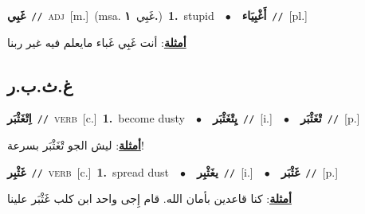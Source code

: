 \documentclass[10pt,a4paper,twoside]{article} %
\begin{document}
\begin{multicols}{2}
{{{{\setlength\topsep{0pt}\textbf{\foreignlanguage{arabic}{غَبِي}}\ {\color{gray}\texttt{//}\color{black}}\ \textsc{adj}\ [m.]\ \color{gray}(msa. \foreignlanguage{arabic}{غَبِي}~\foreignlanguage{arabic}{\textbf{١.}})\color{black}\ \textbf{1.}~stupid\ \ $\bullet$\ \ \setlength\topsep{0pt}\textbf{\foreignlanguage{arabic}{أَغْبِيَاء}}\ {\color{gray}\texttt{//}\color{black}}\ [pl.]\  \begin{flushright}\color{gray}\foreignlanguage{arabic}{\textbf{\underline{\foreignlanguage{arabic}{أمثلة}}}: أنت غَبِي غَباء مايعلم فيه غير ربنا}\end{flushright}\color{black}} \vspace{2mm}

\vspace{-3mm}
\subsection*{\color{blue}\foreignlanguage{arabic}{غ.ث.ب.ر}\color{blue}{}} 

{\setlength\topsep{0pt}\textbf{\foreignlanguage{arabic}{اِتْغَثْبَر}}\ {\color{gray}\texttt{//}\color{black}}\ \textsc{verb}\ [c.]\ \textbf{1.}~become dusty\ \ $\bullet$\ \ \setlength\topsep{0pt}\textbf{\foreignlanguage{arabic}{يِتْغَثْبَر}}\ {\color{gray}\texttt{//}\color{black}}\ [i.]\ \ $\bullet$\ \ \setlength\topsep{0pt}\textbf{\foreignlanguage{arabic}{تْغَثْبَر}}\ {\color{gray}\texttt{//}\color{black}}\ [p.]\  \begin{flushright}\color{gray}\foreignlanguage{arabic}{\textbf{\underline{\foreignlanguage{arabic}{أمثلة}}}: ليش الجو تْغَثْبَر بسرعة!}\end{flushright}\color{black}} \vspace{2mm}

{\setlength\topsep{0pt}\textbf{\foreignlanguage{arabic}{غَثْبِر}}\ {\color{gray}\texttt{//}\color{black}}\ \textsc{verb}\ [c.]\ \textbf{1.}~spread dust\ \ $\bullet$\ \ \setlength\topsep{0pt}\textbf{\foreignlanguage{arabic}{يغَثْبِر}}\ {\color{gray}\texttt{//}\color{black}}\ [i.]\ \ $\bullet$\ \ \setlength\topsep{0pt}\textbf{\foreignlanguage{arabic}{غَثْبَر}}\ {\color{gray}\texttt{//}\color{black}}\ [p.]\  \begin{flushright}\color{gray}\foreignlanguage{arabic}{\textbf{\underline{\foreignlanguage{arabic}{أمثلة}}}: كنا قاعدين بأمان الله. قام إِجى واحد ابن كلب غَثْبَر علينا}\end{flushright}\color{black}} \vspace{2mm}

}}}
\end{multicols}
\end{document}
